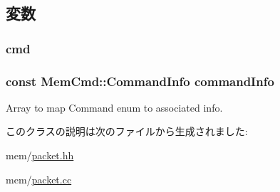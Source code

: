 \subsection{変数}
\hypertarget{classMemCmd_a5870707029cae65976d5de2312937cd5}{
\subsubsection[{cmd}]{ {\bf cmd}}}
\label{classMemCmd_a5870707029cae65976d5de2312937cd5}
\hypertarget{classMemCmd_a258885ef0e0288230122d2523dc46446}{
\subsubsection[{commandInfo}]{\setlength{\rightskip}{0pt plus 5cm}const {\bf MemCmd::CommandInfo} {\bf commandInfo}}}
\label{classMemCmd_a258885ef0e0288230122d2523dc46446}


Array to map Command enum to associated info. 

このクラスの説明は次のファイルから生成されました:\begin{DoxyCompactItemize}
\item 
mem/\hyperlink{packet_8hh}{packet.hh}\item 
mem/\hyperlink{packet_8cc}{packet.cc}\end{DoxyCompactItemize}
